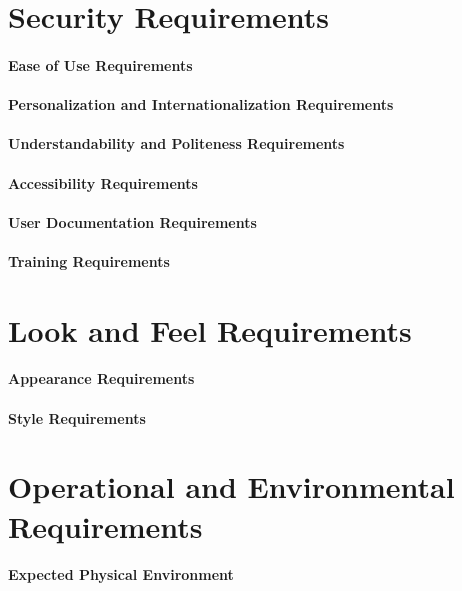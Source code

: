 \documentclass{article}
\begin{document}
\subparagraph{}


\newpage

\section{Security Requirements}
\paragraph{Ease of Use Requirements}
\paragraph{Personalization and Internationalization Requirements}
\paragraph{Understandability and Politeness Requirements}
\paragraph{Accessibility Requirements}
\paragraph{User Documentation Requirements}
\paragraph{Training Requirements}

\newpage
\section{Look and Feel Requirements}
\paragraph{Appearance Requirements}
\paragraph{Style Requirements}


\newpage
\section{Operational and Environmental Requirements}
\paragraph{Expected Physical Environment}
\end{document}
